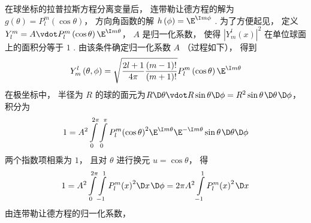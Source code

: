 
在球坐标的拉普拉斯方程分离变量后， 连带勒让德方程的解为 $g\left( \theta  \right) = P_l^m\left( {\cos \theta } \right)$， 方向角函数的解 $h\left( \phi  \right) = {\E^{\I m\phi }}$ . 为了方便起见， 定义 $Y_l^m = A \vdot P_l^m\left( {\cos \theta } \right){\E^{\I m\theta }}$， $A$ 是归一化系数， 使得 ${\left| {Y_m^l\left( x \right)} \right|^2}$ 在单位球面上的面积分等于 $1$ .  由该条件确定归一化系数 $A$ （过程如下）， 得到
\begin{equation}
  Y_m^l\left( {\theta ,\phi } \right) = \sqrt {\frac{2l + 1}{4\pi }\frac{(m - 1)!}{(m + 1)!}} P_l^m\left( {\cos \theta } \right){\E^{\I m\theta }}
\end{equation}
在极坐标中， 半径为 $R$ 的球的面元为$R \D \theta  \vdot R\sin \theta \D \phi  = {R^2}\sin \theta {\kern 1pt} \D \theta {\kern 1pt} \D \phi $，  积分为
\begin{equation}
  1 = {A^2}\int\limits_0^{2\pi } {\int\limits_0^\pi  {P_l^m{{\left( {\cos \theta } \right)}^2}{\E^{\I m\theta }}{\E^{ - \I m\theta }}\sin \theta {\kern 1pt} \D \theta  \D \phi } } 
\end{equation}
两个指数项相乘为 $1$，  且对 $\theta $ 进行换元 $u = \cos \theta $， 得
\begin{equation}
  1 = {A^2}\int\limits_0^{2\pi } {\int\limits_{ - 1}^1 {P_l^m{{\left( x \right)}^2}\D x{\kern 1pt} \D \phi } }  = 2\pi {A^2}\int\limits_{ - 1}^1 {P_l^m{{\left( x \right)}^2}{\kern 1pt} \D x{\kern 1pt} } 
\end{equation}
由连带勒让德方程的归一化系数， %

